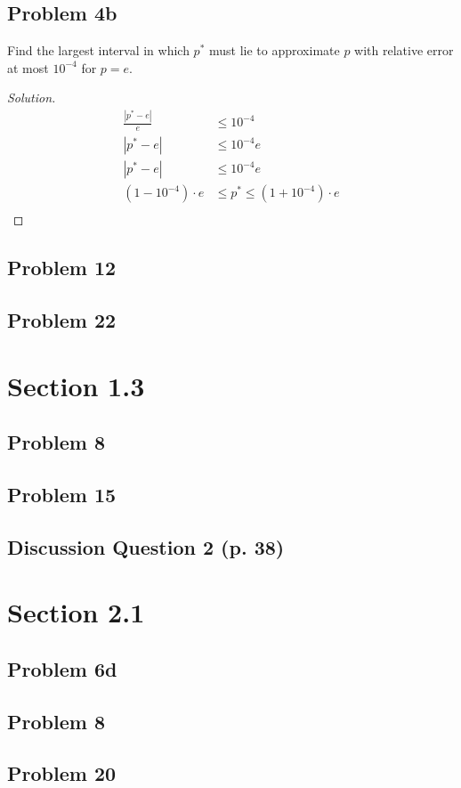 \documentclass{article}
\begin{document}
\subsection*{Problem 4b}
Find the largest interval in which $p^*$ must lie to approximate $p$ with relative error at most 
$10^{-4}$ for $p = e$.
\begin{proof}[Solution]
    \begin{align*}
        \frac{|p^*-e|}{e} & \le 10^{-4} \\
        |p^*-e| & \le 10^{-4}e \\
        |p^* - e| & \le 10^{-4}e \\
        (1-10^{-4})\cdot e & \le p^* \le (1+10^{-4})\cdot e \\
    \end{align*}
\end{proof}

\subsection*{Problem 12}
\subsection*{Problem 22}

\section*{Section 1.3}
\subsection*{Problem 8}
\subsection*{Problem 15}
\subsection*{Discussion Question 2 (p. 38)}

\section*{Section 2.1}
\subsection*{Problem 6d}
\subsection*{Problem 8}
\subsection*{Problem 20}
\end{document}
